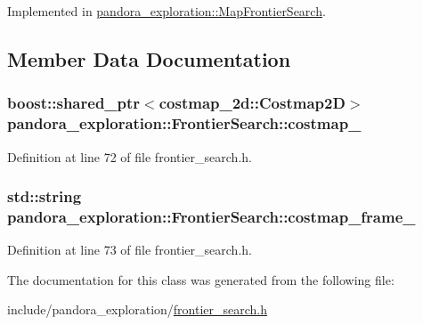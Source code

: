 \-Implemented in \hyperlink{classpandora__exploration_1_1_map_frontier_search_ac948f0d38270a28905ea4f29e16270b2}{pandora\-\_\-exploration\-::\-Map\-Frontier\-Search}.



\subsection{\-Member \-Data \-Documentation}
\hypertarget{classpandora__exploration_1_1_frontier_search_a65d5436654ae8ecdf19afd85a616a4ba}{
\subsubsection[{costmap\-\_\-}]{\setlength{\rightskip}{0pt plus 5cm}boost\-::shared\-\_\-ptr$<$costmap\-\_\-2d\-::\-Costmap2\-D$>$ {\bf pandora\-\_\-exploration\-::\-Frontier\-Search\-::costmap\-\_\-}}}\label{classpandora__exploration_1_1_frontier_search_a65d5436654ae8ecdf19afd85a616a4ba}


\-Definition at line 72 of file frontier\-\_\-search.\-h.

\hypertarget{classpandora__exploration_1_1_frontier_search_a9b65b412000f2b9b3db9ec41f6ee6ba5}{
\subsubsection[{costmap\-\_\-frame\-\_\-}]{\setlength{\rightskip}{0pt plus 5cm}std\-::string {\bf pandora\-\_\-exploration\-::\-Frontier\-Search\-::costmap\-\_\-frame\-\_\-}}}\label{classpandora__exploration_1_1_frontier_search_a9b65b412000f2b9b3db9ec41f6ee6ba5}


\-Definition at line 73 of file frontier\-\_\-search.\-h.



\-The documentation for this class was generated from the following file\-:\begin{DoxyCompactItemize}
\item 
include/pandora\-\_\-exploration/\hyperlink{frontier__search_8h}{frontier\-\_\-search.\-h}\end{DoxyCompactItemize}
